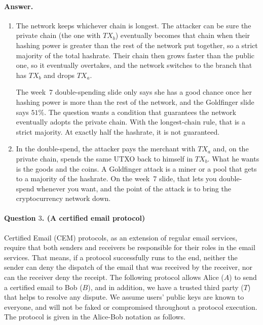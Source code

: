 \documentclass{article}
\begin{document}
\paragraph{Answer.}
\begin{enumerate}
    \item The network keeps whichever chain is longest. The attacker can be sure the private chain (the one with $TX_b$) eventually becomes that chain when their hashing power is greater than the rest of the network put together, so a strict majority of the total hashrate. Their chain then grows faster than the public one, so it eventually overtakes, and the network switches to the branch that has $TX_b$ and drops $TX_a$.

    The week~7 double-spending slide only says she has a good chance once her hashing power is more than the rest of the network, and the Goldfinger slide says $51\%$. The question wants a condition that guarantees the network eventually adopts the private chain. With the longest-chain rule, that is a strict majority. At exactly half the hashrate, it is not guaranteed.

    \item In the double-spend, the attacker pays the merchant with $TX_a$ and, on the private chain, spends the same UTXO back to himself in $TX_b$. What he wants is the goods and the coins. A Goldfinger attack is a miner or a pool that gets to a majority of the hashrate. On the week~7 slide, that lets you double-spend whenever you want, and the point of the attack is to bring the cryptocurrency network down.
\end{enumerate}

\bigskip

\paragraph{Question $3$. (A certified email protocol)}
Certified Email (CEM) protocols, as an extension of regular email services, require that both senders and receivers be responsible for their roles in the email services. That means, if a protocol successfully runs to the end, neither the sender can deny the dispatch of the email that was received by the receiver, nor can the receiver deny the receipt. The following protocol allows Alice ($A$) to send a certified email to Bob ($B$), and in addition, we have a trusted third party ($T$) that helps to resolve any dispute. We assume users' public keys are known to everyone, and will not be faked or compromised throughout a protocol execution. The protocol is given in the Alice-Bob notation as follows.
\end{document}
